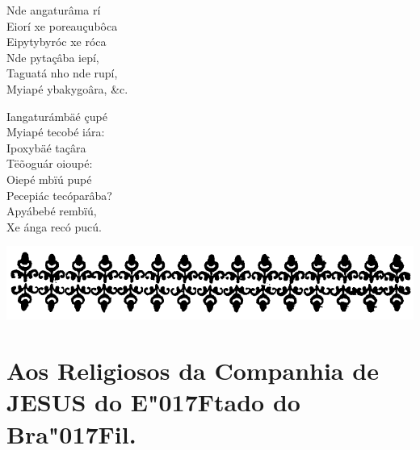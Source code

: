 \documentclass[openany,titlepage,12pt]{book}
\renewcommand{\chaptermark}[1]{\markboth{#1}{}}
\renewcommand{\sectionmark}[1]{\gdef\rightmark{#1}}
\newcommand{\lgS}{\char"017F}
\begin{document}
Nde angaturâma rí\\
Eiorí xe poreauçubôca\\
Eipytybyróc xe róca\\
Nde pytaçâba iepí,\\
Taguatá nho nde rupí,\\
Myiapé ybakygoâra, \&c.

Iangaturámbäé çupé\\
Myiapé tecobé iára:\\
Ipoxybäé taçâra\\
Tëõoguár oioupé:\\
Oiepé mbïú pupé\\
Pecepiác tecóparâba?\\
Apyábebé rembïú,\\
Xe ánga recó pucú.
\newpage

\begin{center}
    \includegraphics[scale=0.20]{02-aos_religiosos.png}
\end{center}
\section{Aos Religiosos da Companhia de 
JESUS do E\lgS tado do Bra\lgS il.}
\chaptermark{}
\sectionmark{}
\vspace*{14pt}
\end{document}
